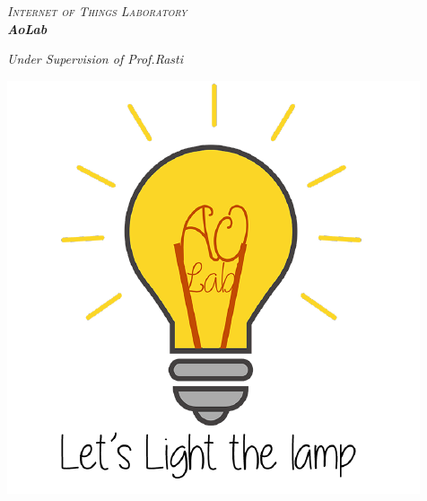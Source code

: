 \documentclass[a5paper]{report}
\begin{document}
\noindent
\slshape\Huge\textsc{Internet of Things Laboratory}\\
\textbf{AoLab}
\par
\vspace{0.5in}
\noindent\Large \textit{Under Supervision of Prof.Rasti}\\
\vspace*{0.8in}
\begin{center}
  \includegraphics[height=.3\textheight]{./aolab.png}
\end{center}
\end{document}
